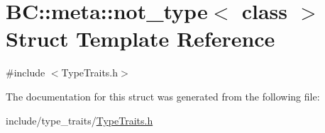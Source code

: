 \hypertarget{structBC_1_1meta_1_1not__type}{}\section{BC\+:\+:meta\+:\+:not\+\_\+type$<$ class $>$ Struct Template Reference}
\label{structBC_1_1meta_1_1not__type}


{\ttfamily \#include $<$Type\+Traits.\+h$>$}



The documentation for this struct was generated from the following file\+:\begin{DoxyCompactItemize}
\item 
include/type\+\_\+traits/\hyperlink{TypeTraits_8h}{Type\+Traits.\+h}\end{DoxyCompactItemize}
